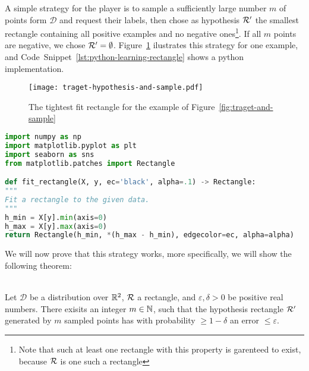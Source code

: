     A simple strategy for the player is to sample a sufficiently large number \(m\) of points form \(\mathcal{D}\) and request their labels, then chose as hypothesis \(\mathcal{R}^\prime\) the smallest rectangle containing all positive examples and no negative ones\footnote{Note that such at least one rectangle with this property is garenteed to exist, because \(\mathcal{R}\) is one such a rectangle}. If all \(m\) points are negative, we chose \(\mathcal{R}^\prime = \emptyset\). Figure~\ref{fig:traget-hypothesis-and-sample} ilustrates this strategy for one example, and Code~Snippet~\ref{lst:python-learning-rectangle} shows a python implementation.

    
    \begin{figure}
        \begin{center}
            \texttt{[image: traget-hypothesis-and-sample.pdf]}
        \end{center}
        \caption{The tightest fit rectangle for the example of Figure~\ref{fig:traget-and-sample}}
        \label{fig:traget-hypothesis-and-sample}
    \end{figure}

    \begin{lstlisting}[language=python, caption={A python implementation of the described strategy}, label={lst:python-learning-rectangle}]
import numpy as np
import matplotlib.pyplot as plt
import seaborn as sns
from matplotlib.patches import Rectangle

def fit_rectangle(X, y, ec='black', alpha=.1) -> Rectangle:
"""
Fit a rectangle to the given data.
"""
h_min = X[y].min(axis=0)
h_max = X[y].max(axis=0)
return Rectangle(h_min, *(h_max - h_min), edgecolor=ec, alpha=alpha)
    \end{lstlisting}

    We will now prove that this strategy works, more specifically, we will show the following theorem:

    \begin{theorem}
        \ \\
        Let \(\mathcal{D}\) be a distribution over \(\mathbb{R}^2\), \(\mathcal{R}\) a rectangle, and \(\varepsilon, \delta>0\) be positive real numbers.
        There exisits an integer \(m\in\mathbb{N}\), such that the hypothesis rectangle \(\mathcal{R}^\prime\) generated by \(m\) sampled points has with probability \(\ge 1 - \delta\) an error \(\le\varepsilon\).
    \end{theorem}

